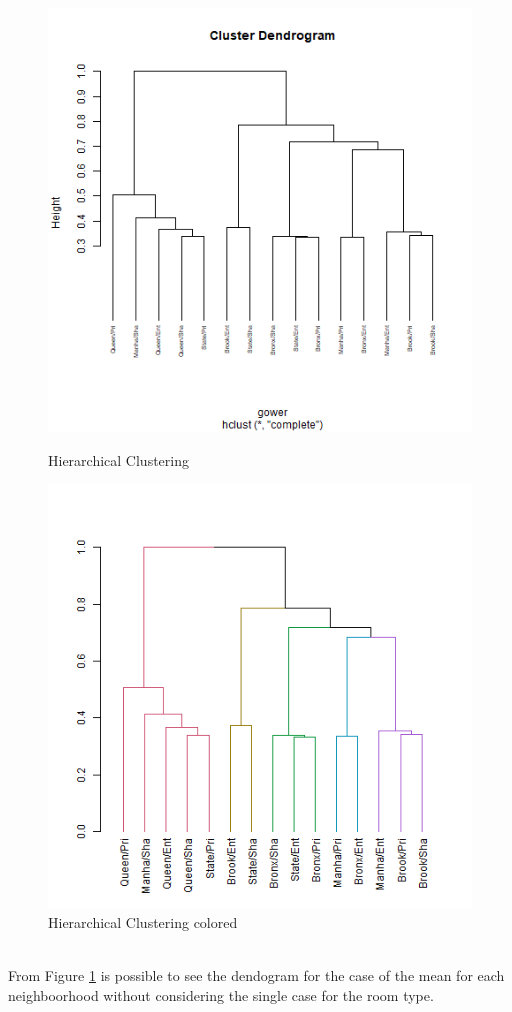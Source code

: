 \documentclass{FR16}
\begin{document}
\begin{figure}[!htb]
   \begin{minipage}{0.48\textwidth}
     \centering
    \includegraphics[width=1\textwidth]{figures/hc.PNG} 
 \caption{\label{fig:26} Hierarchical Clustering}
   \end{minipage}\hfill
   \begin{minipage}{0.48\textwidth}
     \centering
       \includegraphics[width=1\textwidth]{figures/hc2.PNG} 
 \caption{\label{fig:27} Hierarchical Clustering colored }
   \end{minipage}
   
\end{figure}
\\
\noindent From Figure \ref{fig:27} is possible to see the dendogram for the case of the mean for each neighboorhood without considering the single case for the room type. 
\end{document}
